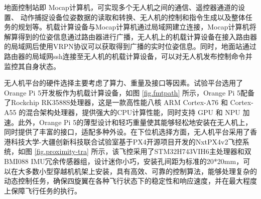 \documentclass[lang=chs, degree=master, blindreview=false, winfonts=true]{yanputhesis}
\begin{document}
地面控制站即 Mocap计算机，可实现多个无人机之间的通信、遥控器通道的设置、 动作捕捉设备位姿数据的读取和转换、无人机的控制和指令生成以及整体任务的规划等。机载计算设备与Mocap计算机通过局域网建立连接，Mocap计算机将解算得到的位姿信息通过路由器进行广播，无人机上的机载计算设备在接入路由器的局域网后使用VRPN协议可以获取得到广播的实时位姿信息。同时，地面站通过路由器的局域网ssh连接至无人机的机载计算设备，可以对无人机发布控制命令并监控其自身状态。

无人机平台的硬件选择主要考虑了算力、重量及接口等因素。试验平台选用了Orange Pi 5开发板作为机载计算设备，如图 \ref{fig.fmtpath} 所示，Orange Pi 5配备了Rockchip RK3588S处理器，这是一款高性能八核 ARM Cortex-A76 和 Cortex-A55 的混合架构处理器，提供强大的CPU计算性能，同时支持 GPU 和 NPU 加速。此外，Orange Pi 5的薄型设计和轻巧重量使其能够轻松地安装在无人机上，同时提供了丰富的接口，适配多种外设。在下位机选择方面，无人机平台采用了香港科技大学-大疆创新科技联合试验室基于PX4开源项目开发的NxtPX4v2飞控系统，如图 \ref{fig.proximity-tra} 所示，该飞控采用了STM32H743VIH6主处理器和双BMI088 IMU冗余传感器组，设计迷你小巧，安装孔间距为标准的20*20mm，可以在大多数小型穿越机机架上安装，具有高效、可靠的控制算法，能够处理复杂的动态控制任务，确保四旋翼在各种飞行状态下的稳定性和响应速度，并在最大程度上保障飞行任务的执行。
\end{document}
